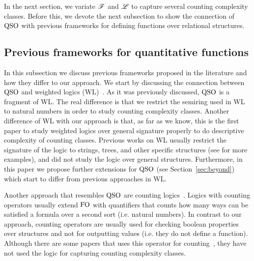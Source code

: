 In the next section, we variate $\mathscr{F}$ and $\mathscr{L}$ to capture several counting complexity classes. Before this, we devote the next subsection to show the connection of ${\rm QSO}$ with previous frameworks for defining functions over relational structures.

\subsection{Previous frameworks for quantitative functions} \label{sec:previous}

In this subsection we discuss previous frameworks proposed in the literature and how they differ to our approach.
We start by discussing the connection between ${\rm QSO}$ and weighted logics (WL)~\cite{DrosteG07}. 
As it was previously discussed, ${\rm QSO}$ is a fragment of WL.
The real difference is that we restrict the semiring used in WL to natural numbers in order to study counting complexity classes.
Another difference of WL with our approach is that, as far as we know, this is the first paper to study weighted logics over general signature properly to do descriptive complexity of counting classes. 
Previous works on WL usually restrict the signature of the logic to strings, trees, and other specific structures (see \cite{droste2009handbook} for more examples), and did not study the logic over general structures. 
Furthermore, in this paper we propose further extensions for ${\rm QSO}$ (see Section~\ref{sec:beyond}) which start to differ from previous approaches in WL.

Another approach that resembles ${\rm QSO}$ are counting logics~\cite{L04,counting-paper-here}. 
Logics with counting operators usually extend ${\rm FO}$ with quantifiers that counts how many ways can be satisfied a formula over a second sort (i.e. natural numbers). 
In contrast to our approach, counting operators are usually used for checking boolean properties over structures and not for outputting values (i.e. they do not define a function).
Although there are some papers that uses this operator for counting~\cite{XXX}, they have not used the logic for capturing counting complexity classes.



